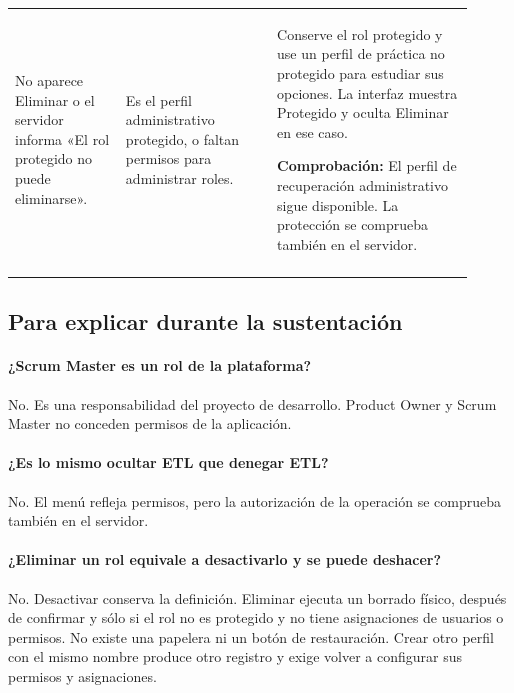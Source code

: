 \begin{longtable}{@{}>{\RaggedRight\arraybackslash}p{0.22\linewidth}>{\RaggedRight\arraybackslash}p{0.3\linewidth}>{\RaggedRight\arraybackslash}p{0.39\linewidth}@{}}
\addlinespace[3pt]
No aparece Eliminar o el servidor informa «El rol protegido no puede eliminarse». & Es el perfil administrativo protegido, o faltan permisos para administrar roles. & Conserve el rol protegido y use un perfil de práctica no protegido para estudiar sus opciones. La interfaz muestra Protegido y oculta Eliminar en ese caso.\par\smallskip\textbf{Comprobación:} El perfil de recuperación administrativo sigue disponible. La protección se comprueba también en el servidor. \\
\addlinespace[3pt]
\end{longtable}
\endgroup

\subsection{Para explicar durante la sustentación}
\paragraph{¿Scrum Master es un rol de la plataforma?} No. Es una responsabilidad del proyecto de desarrollo. Product Owner y Scrum Master no conceden permisos de la aplicación.

\paragraph{¿Es lo mismo ocultar ETL que denegar ETL?} No. El menú refleja permisos, pero la autorización de la operación se comprueba también en el servidor.

\paragraph{¿Eliminar un rol equivale a desactivarlo y se puede deshacer?} No. Desactivar conserva la definición. Eliminar ejecuta un borrado físico, después de confirmar y sólo si el rol no es protegido y no tiene asignaciones de usuarios o permisos. No existe una papelera ni un botón de restauración. Crear otro perfil con el mismo nombre produce otro registro y exige volver a configurar sus permisos y asignaciones.


